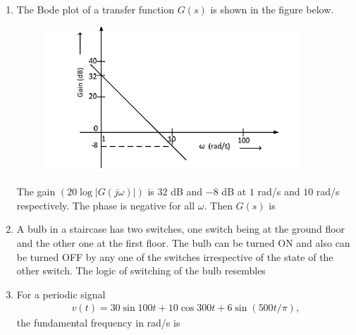 \documentclass[journal,12pt,onecolumn]{IEEEtran}
\theoremstyle{remark}
\begin{document}
\begin{enumerate}
\item The Bode plot of a transfer function $G(s)$ is shown in the figure below.  

\begin{figure}[H]
    \centering
    \includegraphics[width=0.5\columnwidth]{figs/6.png}
    \label{fig:placeholder}
\end{figure}
The gain $(20\log|G(j\omega)|)$ is $32$ dB and $-8$ dB at $1$ rad/s and $10$ rad/s respectively. The phase is negative for all $\omega$. Then $G(s)$ is  

\begin{enumerate}
\end{enumerate}

\item A bulb in a staircase has two switches, one switch being at the ground floor and the other one at the first floor. The bulb can be turned ON and also can be turned OFF by any one of the switches irrespective of the state of the other switch. The logic of switching of the bulb resembles  

\begin{enumerate}
\end{enumerate}


\item For a periodic signal 
\begin{align*}
    v(t) = 30\sin 100t + 10\cos 300t + 6\sin(500t/\pi),
\end{align*}
the fundamental frequency in rad/s is  


\end{enumerate}
\end{document}
